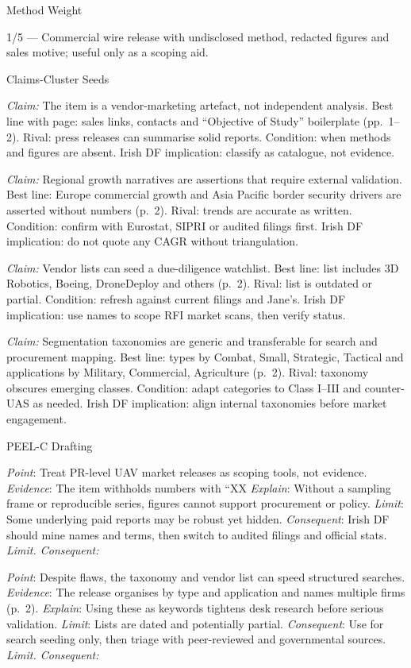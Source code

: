 Method Weight

1/5 — Commercial wire release with undisclosed method, redacted figures and sales motive; useful only as a scoping aid.

Claims-Cluster Seeds

\textit{Claim:} The item is a vendor-marketing artefact, not independent analysis.
Best line with page: sales links, contacts and “Objective of Study” boilerplate (pp.~1–2). Rival: press releases can summarise solid reports. Condition: when methods and figures are absent. Irish DF implication: classify as catalogue, not evidence.

\textit{Claim:} Regional growth narratives are assertions that require external validation.
Best line: Europe commercial growth and Asia Pacific border security drivers are asserted without numbers (p.~2). Rival: trends are accurate as written. Condition: confirm with Eurostat, SIPRI or audited filings first. Irish DF implication: do not quote any CAGR without triangulation.

\textit{Claim:} Vendor lists can seed a due-diligence watchlist.
Best line: list includes 3D Robotics, Boeing, DroneDeploy and others (p.~2). Rival: list is outdated or partial. Condition: refresh against current filings and Jane’s. Irish DF implication: use names to scope RFI market scans, then verify status.

\textit{Claim:} Segmentation taxonomies are generic and transferable for search and procurement mapping.
Best line: types by Combat, Small, Strategic, Tactical and applications by Military, Commercial, Agriculture (p.~2). Rival: taxonomy obscures emerging classes. Condition: adapt categories to Class I–III and counter-UAS as needed. Irish DF implication: align internal taxonomies before market engagement.

PEEL-C Drafting

\textit{Point}: Treat PR-level UAV market releases as scoping tools, not evidence.
\textit{Evidence}: The item withholds numbers with “XX%
\textit{Explain}: Without a sampling frame or reproducible series, figures cannot support procurement or policy.
\textit{Limit}: Some underlying paid reports may be robust yet hidden.
\textit{Consequent}: Irish DF should mine names and terms, then switch to audited filings and official stats.
\textit{Limit. Consequent:}

\textit{Point}: Despite flaws, the taxonomy and vendor list can speed structured searches.
\textit{Evidence}: The release organises by type and application and names multiple firms (p.~2).
\textit{Explain}: Using these as keywords tightens desk research before serious validation.
\textit{Limit}: Lists are dated and potentially partial.
\textit{Consequent}: Use for search seeding only, then triage with peer-reviewed and governmental sources.
\textit{Limit. Consequent:}

